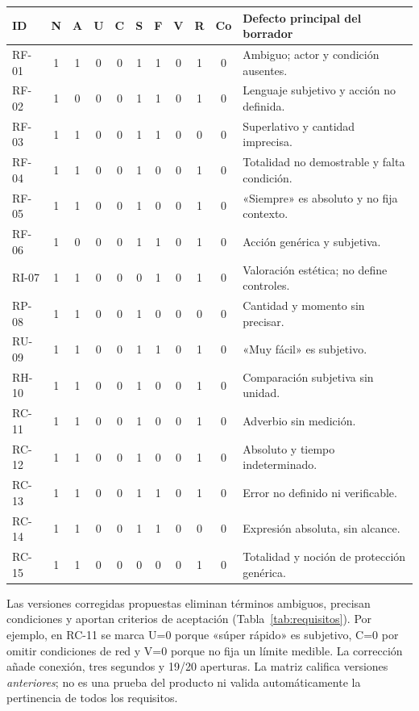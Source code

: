 \documentclass[11pt,a4paper]{article}
\begin{document}
{\footnotesize\centering
\begin{tabular}{@{}l*{9}{c}p{5.8cm}@{}}\toprule
\textbf{ID}&\textbf{N}&\textbf{A}&\textbf{U}&\textbf{C}&\textbf{S}&\textbf{F}&\textbf{V}&\textbf{R}&\textbf{Co}&\textbf{Defecto principal del borrador}\\\midrule
RF-01 & 1 & 1 & 0 & 0 & 1 & 1 & 0 & 1 & 0 & Ambiguo; actor y condición ausentes.\\
RF-02 & 1 & 0 & 0 & 0 & 1 & 1 & 0 & 1 & 0 & Lenguaje subjetivo y acción no definida.\\
RF-03 & 1 & 1 & 0 & 0 & 1 & 1 & 0 & 0 & 0 & Superlativo y cantidad imprecisa.\\
RF-04 & 1 & 1 & 0 & 0 & 1 & 0 & 0 & 1 & 0 & Totalidad no demostrable y falta condición.\\
RF-05 & 1 & 1 & 0 & 0 & 1 & 0 & 0 & 1 & 0 & «Siempre» es absoluto y no fija contexto.\\
RF-06 & 1 & 0 & 0 & 0 & 1 & 1 & 0 & 1 & 0 & Acción genérica y subjetiva.\\
RI-07 & 1 & 1 & 0 & 0 & 0 & 1 & 0 & 1 & 0 & Valoración estética; no define controles.\\
RP-08 & 1 & 1 & 0 & 0 & 1 & 0 & 0 & 0 & 0 & Cantidad y momento sin precisar.\\
RU-09 & 1 & 1 & 0 & 0 & 1 & 1 & 0 & 1 & 0 & «Muy fácil» es subjetivo.\\
RH-10 & 1 & 1 & 0 & 0 & 1 & 0 & 0 & 1 & 0 & Comparación subjetiva sin unidad.\\
RC-11 & 1 & 1 & 0 & 0 & 1 & 0 & 0 & 1 & 0 & Adverbio sin medición.\\
RC-12 & 1 & 1 & 0 & 0 & 1 & 0 & 0 & 1 & 0 & Absoluto y tiempo indeterminado.\\
RC-13 & 1 & 1 & 0 & 0 & 1 & 1 & 0 & 1 & 0 & Error no definido ni verificable.\\
RC-14 & 1 & 1 & 0 & 0 & 1 & 1 & 0 & 0 & 0 & Expresión absoluta, sin alcance.\\
RC-15 & 1 & 1 & 0 & 0 & 0 & 0 & 0 & 1 & 0 & Totalidad y noción de protección genérica.\\
\bottomrule\end{tabular}}
\par\smallskip
Las versiones corregidas propuestas eliminan términos ambiguos, precisan condiciones y aportan criterios de aceptación (Tabla~\ref{tab:requisitos}). Por ejemplo, en RC-11 se marca U=0 porque «súper rápido» es subjetivo, C=0 por omitir condiciones de red y V=0 porque no fija un límite medible. La corrección añade conexión, tres segundos y 19/20 aperturas. La matriz califica versiones \emph{anteriores}; no es una prueba del producto ni valida automáticamente la pertinencia de todos los requisitos.
\end{document}
